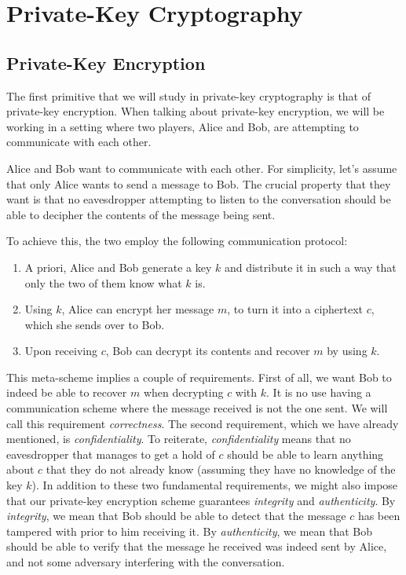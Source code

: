 \chapter{Private-Key Cryptography}
\section{Private-Key Encryption}
The first primitive that we will study in private-key cryptography is that of private-key encryption.
When talking about private-key encryption, we will be working in a setting where two players, Alice and Bob, are attempting to communicate with each other.

Alice and Bob want to communicate with each other.
For simplicity, let's assume that only Alice wants to send a message to Bob.
The crucial property that they want is that no eavesdropper attempting to listen to the conversation should be able to decipher the contents of the message being sent.
\begin{comment}
\begin{center}
    \begin{tikzpicture}
        \draw;
    \end{tikzpicture}
\end{center}    
\end{comment}

To achieve this, the two employ the following communication protocol:
\begin{enumerate}
    \item A priori, Alice and Bob generate a key $k$ and distribute it in such a way that only the two of them know what $k$ is.
    \item Using $k$, Alice can encrypt her message $m$, to turn it into a ciphertext $c$, which she sends over to Bob. 
    \item Upon receiving $c$, Bob can decrypt its contents and recover $m$ by using $k$.
\end{enumerate}
This meta-scheme implies a couple of requirements.
First of all, we want Bob to indeed be able to recover $m$ when decrypting $c$ with $k$.
It is no use having a communication scheme where the message received is not the one sent. We will call this requirement \textit{correctness}.
The second requirement, which we have already mentioned, is \textit{confidentiality}.
To reiterate, \textit{confidentiality} means that no eavesdropper that manages to get a hold of $c$ should be able to learn anything about $c$ that they do not already know (assuming they have no knowledge of the key $k$).
In addition to these two fundamental requirements, we might also impose that our private-key encryption scheme guarantees \textit{integrity} and \textit{authenticity}.
By \textit{integrity}, we mean that Bob should be able to detect that the message $c$ has been tampered with prior to him receiving it.
By \textit{authenticity}, we mean that Bob should be able to verify that the message he received was indeed sent by Alice, and not some adversary interfering with the conversation.

